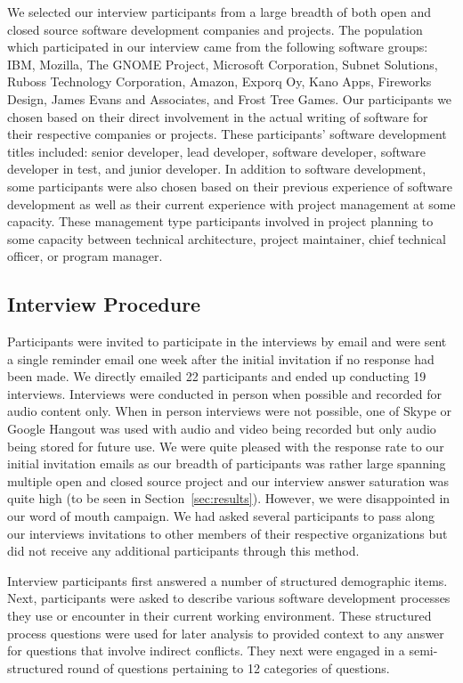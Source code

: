 \documentclass[conference]{IEEEtran}
\begin{document}
We selected our interview participants from a large breadth of both open and closed source software development companies
and projects. The population which participated in our interview came from the following software groups: 
IBM, Mozilla, The GNOME Project, Microsoft Corporation, Subnet Solutions, Ruboss Technology Corporation, 
Amazon, Exporq Oy, Kano Apps, Fireworks Design, James Evans and Associates, and Frost Tree Games. 
Our participants we chosen based on their direct involvement in the actual writing of software for
their respective companies or projects. These participants' software development titles included: senior developer,
lead developer, software developer, software developer in test, and junior developer.
In addition to software development, some participants were also chosen based on their previous experience
of software development as well as their current experience with project management at some capacity. These management
type participants involved in project planning to some capacity between technical architecture, project maintainer,  
chief technical officer, or program manager.

\subsection{Interview Procedure}

Participants were invited to participate in the interviews by email and were sent a single reminder email one week
after the initial invitation if no response had been made. We directly emailed 22 participants and ended up conducting
19 interviews. Interviews were conducted in person when possible and recorded for audio content only. When in person
interviews were not possible, one of Skype or Google Hangout was used with audio and video being recorded but only
audio being stored for future use. We were quite pleased with the response rate to our initial invitation emails as
our breadth of participants was rather large spanning multiple open and closed source project and our interview 
answer saturation was quite high (to be seen in Section~\ref{sec:results}). However, we were disappointed in our word
of mouth campaign. We had asked several participants to pass along our interviews invitations to other members of
their respective organizations but did not receive any additional participants through this method.

Interview participants first answered a number of structured demographic items. Next, participants were 
asked to describe various software development processes they use or encounter in their current working
environment. These structured process questions were used for later analysis to provided context to
any answer for questions that involve indirect conflicts. They next were engaged in a
semi-structured round of questions pertaining to 12 categories of questions. 
\end{document}
